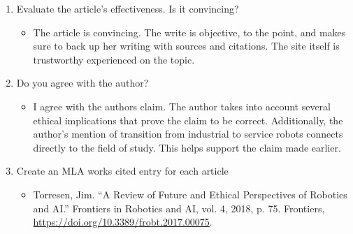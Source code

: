 \documentclass{scrartcl}
\begin{document}
\begin{enumerate}
\item Evaluate the article's effectiveness. Is it convincing?
\begin{itemize}
\item The article is convincing. The write is objective, to the point, and makes
sure to back up her writing with sources and citations. The site itself is
trustworthy experienced on the topic.
\end{itemize}

\item Do you agree with the author?
\begin{itemize}
\item I agree with the authors claim. The author takes into account several
ethical implications that prove the claim to be correct. Additionally, the
author's mention of transition from industrial to service robots connects
directly to the field of study. This helps support the claim made earlier.
\end{itemize}

\item Create an MLA works cited entry for each article
\begin{itemize}
\item Torresen, Jim. “A Review of Future and Ethical Perspectives of Robotics
and AI.” Frontiers in Robotics and AI, vol. 4, 2018, p. 75. Frontiers,
\url{https://doi.org/10.3389/frobt.2017.00075}.
\end{itemize}
\end{enumerate}
\end{document}
